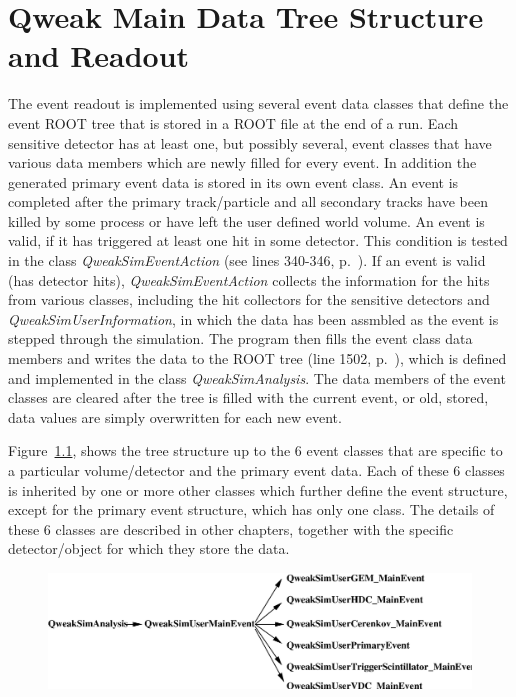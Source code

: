 \chapter{Qweak Main Data Tree Structure and Readout}\label{CHP_XIII}

The event readout is implemented using several event data classes that
define the event ROOT tree that is stored in a ROOT file at the end of
a run. Each sensitive detector has at least one, but possibly several,
event classes that have various data members which are newly filled
for every event. In addition the generated primary event data is
stored in its own event class. An event is completed after the primary
track/particle and all secondary tracks have been killed by some
process or have left the user defined world volume. An event is valid,
if it has triggered at least one hit in some detector. This condition
is tested in the class {\em QweakSimEventAction} (see lines 340-346,
p.~\pageref{SourceXIII21}). If an event is valid (has detector hits),
{\em QweakSimEventAction} collects the information for the hits from
various classes, including the hit collectors for the sensitive
detectors and {\em QweakSimUserInformation}, in which the data has
been assmbled as the event is stepped through the simulation. The
program then fills the event class data members and writes the data to
the ROOT tree (line 1502, p.~\pageref{SourceXIII41}), which is defined
and implemented in the class {\em QweakSimAnalysis}. The data members
of the event classes are cleared after the tree is filled with the
current event, or old, stored, data values are simply overwritten for
each new event.

Figure~\ref{fig:EVENTSTRUC}, shows the tree structure up to the 6
event classes that are specific to a particular volume/detector and
the primary event data. Each of these 6 classes is inherited by one or
more other classes which further define the event structure, except
for the primary event structure, which has only one class. The details
of these 6 classes are described in other chapters, together with the
specific detector/object for which they store the data.

\begin{landscape}
\begin{figure}[h]
  \hspace{0cm}
  \includegraphics[scale=0.7]{./figures13/EventTreeStructure.eps}
  \caption{}
           \label{fig:EVENTSTRUC}
\end{figure}
\end{landscape}



